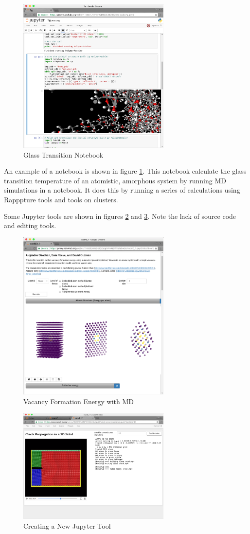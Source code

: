 \documentclass[conference]{../sty/IEEEtran}
\begin{document}
\begin{figure}[!h]
	\includegraphics[width=3in]{tgnb}
	\caption{Glass Transition Notebook \cite{tg}}
	\label{fig_tg}
\end{figure}

An example of a notebook is shown in figure \ref{fig_tg}.  This notebook calculate the glass transition temperature of an atomistic, amorphous system by running MD simulations in a notebook.  It does this by running a series of calculations using Rapppture tools and tools on clusters.

Some Jupyter tools are  shown in figures \ref{fig_mdvacancy} and \ref{fig_crack}.  Note the lack of source code and editing tools.
\begin{figure}[!h]
	\includegraphics[width=3in]{mdvacancy}
	\caption{Vacancy Formation Energy with MD \cite{mdvacancy}}
	\label{fig_mdvacancy}
\end{figure}

\begin{figure}[!h]
	\includegraphics[width=3in]{crack}
	\caption{Creating a New Jupyter Tool}
	\label{fig_crack}
\end{figure}
\end{document}
